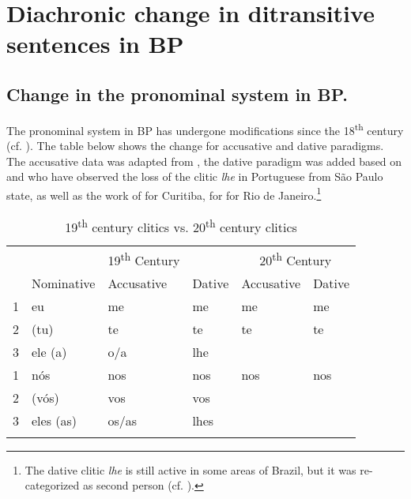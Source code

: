 \documentclass[output=paper,colorlinks,citecolor=brown,nonflat]{./langscibook}
\begin{document}
\section{Diachronic change in ditransitive sentences in BP}\label{sec:calindro:2}
\subsection{Change in the pronominal system in BP.}
\label{sec:calindro:2.1}
The pronominal system in BP has undergone modifications since the 18\textsuperscript{th} century (cf. \citealt{KatoCyrinoCorrêa2009}). The table below shows the change for accusative and dative paradigms. The accusative data was adapted from \citet[246]{KatoCyrinoCorrêa2009}, the dative paradigm was added based on \citet{Calindro2015} and \citet{TorresMoraisBerlinck2006} who have observed the loss of the clitic \textit{lhe} in Portuguese from São Paulo state, as well as the work of \citet{Berlinck1997} for Curitiba, \citet{Silveira1999} for \citet{Freire2005} for Rio de Janeiro.\footnote{The dative clitic \textit{lhe} is still active in some areas of Brazil, but it was re-categorized as second person (cf. \citealt{FigueiredoSilva2007}).}

\begin{table}
\caption{19\textsuperscript{th} century clitics vs. 20\textsuperscript{th} century clitics}
\label{tab:calindro:1}
\begin{tabularx}{\textwidth}{X llX ll}
\lsptoprule
&  &{ 19\textsuperscript{th} Century} & & \multicolumn{2}{c}{{ 20\textsuperscript{th} Century}}\\
\cmidrule(lr{.1em}){2-4}\cmidrule(lr{.1em}){5-6}
& {{Nominative}} & {{Accusative}} & {{Dative}} & {{Accusative}} & {{Dative}}\\
\midrule
{1}  & eu & me & me & me & me\\
{2}  & (tu) & te & te & te & te\\
{3}  & ele (a) & o/a & lhe & {\longrule} & {\longrule}\\
  \tablevspace
{1}  & nós & nos & nos & nos & nos\\
{2} & (vós) & vos & vos & {\longrule} & {\longrule}\\
{3}  & eles (as) & os/as & lhes & {\longrule} & {\longrule}\\
\lspbottomrule
\end{tabularx}
\end{table}
\end{document}
